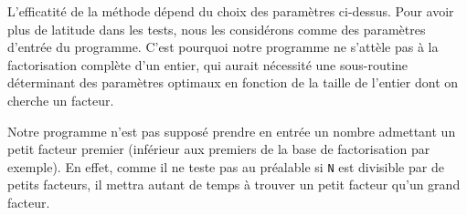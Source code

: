 \begin{remarque}
L'efficatité de la méthode dépend du choix des paramètres ci-dessus. Pour avoir
plus de latitude dans les tests, nous les considérons comme des paramètres 
d'entrée du programme. C'est pourquoi notre programme ne s'attèle pas à la
factorisation complète d'un entier, qui aurait nécessité une sous-routine 
déterminant des paramètres optimaux en fonction de la taille de l'entier 
dont on cherche un facteur. 
   
\end{remarque}

\begin{remarque}
Notre programme n'est pas supposé prendre en entrée un nombre admettant un petit
facteur premier (inférieur aux premiers de la base de factorisation par exemple).
En effet, comme il ne teste pas au préalable si \texttt{N} est divisible par de 
petits facteurs, il mettra autant de temps à trouver un petit facteur qu'un
grand facteur.
\end{remarque}
